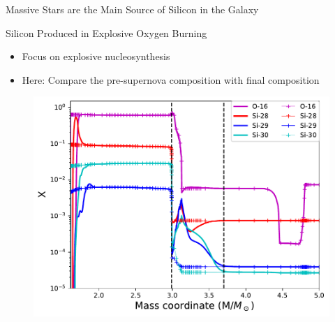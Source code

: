 \documentclass[10pt]{beamer}
\begin{document}
\begin{frame}{Massive Stars are the Main Source of Silicon in the Galaxy}
\begin{figure}
\begin{subfigure}[b]{0.48\textwidth}
        \end{subfigure}
    \end{figure}
\end{frame}



\begin{frame}{Silicon Produced in Explosive Oxygen Burning}
    \begin{minipage}{5cm}
        \begin{itemize}
        \setlength\itemsep{2em}
            \item Focus on explosive nucleosynthesis
            \item Here: Compare the pre-supernova composition with final composition
        \end{itemize}
    \end{minipage}
    \begin{minipage}{6.5cm}
    \centering
        \begin{figure}
            \centering
            \includegraphics[width = \textwidth]{figs/explosive.pdf}
        \end{figure}
    \end{minipage}   
\end{frame}
\end{document}
